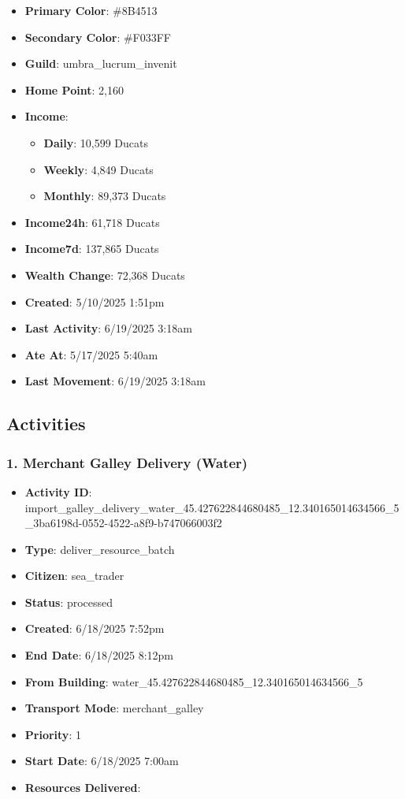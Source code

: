 \documentclass[11pt,a4paper]{article}
\begin{document}
\begin{itemize}
\item \textbf{Primary Color}: \#8B4513
\item \textbf{Secondary Color}: \#F033FF
\item \textbf{Guild}: umbra\_lucrum\_invenit
\item \textbf{Home Point}: 2,160
\item \textbf{Income}:
  \begin{itemize}
  \item \textbf{Daily}: 10,599 Ducats
  \item \textbf{Weekly}: 4,849 Ducats
  \item \textbf{Monthly}: 89,373 Ducats
  \end{itemize}
\item \textbf{Income24h}: 61,718 Ducats
\item \textbf{Income7d}: 137,865 Ducats
\item \textbf{Wealth Change}: 72,368 Ducats
\item \textbf{Created}: 5/10/2025 1:51pm
\item \textbf{Last Activity}: 6/19/2025 3:18am
\item \textbf{Ate At}: 5/17/2025 5:40am
\item \textbf{Last Movement}: 6/19/2025 3:18am
\end{itemize}

\subsection{Activities}

\subsubsection{1. Merchant Galley Delivery (Water)}

\begin{itemize}
\item \textbf{Activity ID}: import\_galley\_delivery\_water\_45.427622844680485\_12.340165014634566\_5\_3ba6198d-0552-4522-a8f9-b747066003f2
\item \textbf{Type}: deliver\_resource\_batch
\item \textbf{Citizen}: sea\_trader
\item \textbf{Status}: processed
\item \textbf{Created}: 6/18/2025 7:52pm
\item \textbf{End Date}: 6/18/2025 8:12pm
\item \textbf{From Building}: water\_45.427622844680485\_12.340165014634566\_5
\item \textbf{Transport Mode}: merchant\_galley
\item \textbf{Priority}: 1
\item \textbf{Start Date}: 6/18/2025 7:00am
\item \textbf{Resources Delivered}:
\end{itemize}
\end{document}
